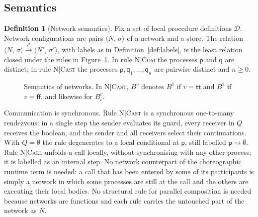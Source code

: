 \documentclass[11pt]{article}
\makeatletter
\theoremstyle{plain}
\theoremstyle{definition}
\newtheorem{definition}[theorem]{Definition}
\theoremstyle{remark}
\newcommand{\ttrue}{\mathsf{tt}}
\newcommand{\ffalse}{\mathsf{ff}}
\newcommand{\seq}{;\;}
\newcommand{\pp}{\mathsf{p}}
\newcommand{\qq}{\mathsf{q}}
\newcommand{\eval}[3]{#1 \downarrow_{#2} #3}
\newcommand{\conf}[2]{\langle #1,\, #2\rangle}
\newcommand{\lto}[1]{\xrightarrow{\;#1\;}}
\newcommand{\tauat}[1]{\tau\mathord{@}#1}
\newcommand{\cast}[2]{#1 \rightsquigarrow #2}
\newcommand{\upd}[3]{#1[#2 \mapsto #3]}
\newcommand{\rn}[1]{{\normalfont\scshape #1}}
\newcommand{\sendbr}[4]{#1!#2 \mathbin{\triangleright} (#3,\, #4)}
\newcommand{\recvbr}[3]{#1?(#2,\, #3)}
\newcommand{\NDefs}{\mathcal{D}}
\newcommand{\ldef}[2]{\NDefs_{#1}(#2)}
\makeatother
\begin{document}
\subsection{Semantics}

\begin{definition}[Network semantics]\label{def:net-sem}
  Fix a set of local procedure definitions $\NDefs$.  Network configurations
  are pairs $\conf{N}{\sigma}$ of a network and a store.  The relation
  $\conf{N}{\sigma}\lto{\mu}\conf{N'}{\sigma'}$, with labels as in
  Definition~\ref{def:labels}, is the least relation closed under the rules
  in Figure~\ref{fig:net-sem}.  In rule \rn{N|Com} the processes $\pp$ and
  $\qq$ are distinct; in rule \rn{N|Cast} the processes
  $\pp,\qq_1,\ldots,\qq_n$ are pairwise distinct and $n\geq 0$.
\end{definition}

\begin{figure}[t]
\caption{Semantics of networks.  In \rn{N|Cast}, $B^v$ denotes $B^1$ if $v=\ttrue$ and $B^2$ if $v=\ffalse$, and likewise for $B_i^v$.}
\label{fig:net-sem}
\end{figure}

Communication is synchronous.  Rule \rn{N|Cast} is a synchronous
one-to-many rendezvous: in a single step the sender evaluates its guard,
every receiver in $Q$ receives the boolean, and the sender and all receivers
select their continuations.  With $Q=\emptyset$ the rule degenerates to a
local conditional at $\pp$, still labelled $\cast{\pp}{\emptyset}$.  Rule
\rn{N|Call} unfolds a call locally, without synchronising with any other
process; it is labelled as an internal step.  No network counterpart of the
choreographic runtime term is needed: a call that has been entered by some
of its participants is simply a network in which some processes are still
at the call and the others are executing their local bodies.  No structural
rule for parallel composition is needed because networks are functions and
each rule carries the untouched part of the network as $N$.
\end{document}
